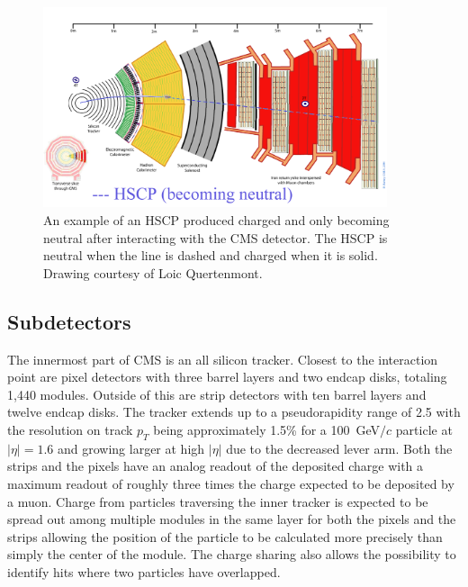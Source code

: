 \begin{figure}
  \begin{center}
      \includegraphics[clip=true, trim=0.0cm 0cm 3.0cm 0cm, width=0.9\textwidth]{figures/apparatus/ParticleInCMS_0000_HSCP-(becoming-neutral).png}
      \caption[An example of an HSCP produced charged and becoming neutral after interacting with the CMS detector.]
              {An example of an HSCP produced charged and only becoming neutral after interacting with the CMS detector. The HSCP is neutral when the line is dashed
and charged when it is solid. Drawing courtesy of Loic Quertenmont.
         }
      \label{fig:CMSTkOnly}
  \end{center}
\end{figure}

\subsection{Subdetectors \label{sec:subsystems}}
The innermost part of CMS is an all silicon tracker. Closest to the interaction point are pixel detectors with three barrel layers and two endcap disks, totaling 1,440 modules. 
Outside of this are strip detectors with ten barrel layers and twelve endcap disks. The tracker extends up to a pseudorapidity range of 2.5 with the resolution on track
$p_T$ being approximately 1.5\% for a 100~GeV$/c$ particle at $|\eta| = 1.6$ and growing larger at high $|\eta|$ due to the decreased lever arm. Both the strips and the
pixels have an analog readout of the deposited charge with a maximum readout of roughly three times the charge expected to be deposited by a muon. Charge from
particles traversing the inner tracker is expected to be spread out among multiple modules in the same layer for both the pixels and the strips
allowing the position of the particle to be calculated
more precisely than simply the center of the module. The charge sharing also allows the possibility to identify hits where two particles have overlapped.

